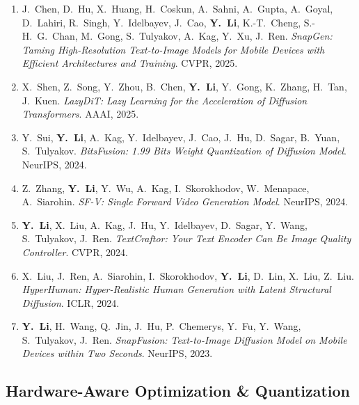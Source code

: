 \documentclass[11pt,letterpaper]{article}
\newcommand{\pub}[4]{%
    \item #1. \textit{#2}. #3, #4.
}
\begin{document}
\begin{enumerate}[resume]
\pub{J.\ Chen, D.\ Hu, X.\ Huang, H.\ Coskun, A.\ Sahni, A.\ Gupta, A.\ Goyal, D.\ Lahiri, R.\ Singh, Y.\ Idelbayev, J.\ Cao, \textbf{Y.\ Li}, K.-T.\ Cheng, S.-H.\ G.\ Chan, M.\ Gong, S.\ Tulyakov, A.\ Kag, Y.\ Xu, J.\ Ren}
    {SnapGen: Taming High-Resolution Text-to-Image Models for Mobile Devices with Efficient Architectures and Training}
    {CVPR}{2025}

\pub{X.\ Shen, Z.\ Song, Y.\ Zhou, B.\ Chen, \textbf{Y.\ Li}, Y.\ Gong, K.\ Zhang, H.\ Tan, J.\ Kuen}
    {LazyDiT: Lazy Learning for the Acceleration of Diffusion Transformers}
    {AAAI}{2025}

\pub{Y.\ Sui, \textbf{Y.\ Li}, A.\ Kag, Y.\ Idelbayev, J.\ Cao, J.\ Hu, D.\ Sagar, B.\ Yuan, S.\ Tulyakov}
    {BitsFusion: 1.99 Bits Weight Quantization of Diffusion Model}
    {NeurIPS}{2024}

\pub{Z.\ Zhang, \textbf{Y.\ Li}, Y.\ Wu, A.\ Kag, I.\ Skorokhodov, W.\ Menapace, A.\ Siarohin}
    {SF-V: Single Forward Video Generation Model}
    {NeurIPS}{2024}

\pub{\textbf{Y.\ Li}, X.\ Liu, A.\ Kag, J.\ Hu, Y.\ Idelbayev, D.\ Sagar, Y.\ Wang, S.\ Tulyakov, J.\ Ren}
    {TextCraftor: Your Text Encoder Can Be Image Quality Controller}
    {CVPR}{2024}

\pub{X.\ Liu, J.\ Ren, A.\ Siarohin, I.\ Skorokhodov, \textbf{Y.\ Li}, D.\ Lin, X.\ Liu, Z.\ Liu}
    {HyperHuman: Hyper-Realistic Human Generation with Latent Structural Diffusion}
    {ICLR}{2024}

\pub{\textbf{Y.\ Li}, H.\ Wang, Q.\ Jin, J.\ Hu, P.\ Chemerys, Y.\ Fu, Y.\ Wang, S.\ Tulyakov, J.\ Ren}
    {SnapFusion: Text-to-Image Diffusion Model on Mobile Devices within Two Seconds}
    {NeurIPS}{2023}

\end{enumerate}

\subsection*{Hardware-Aware Optimization \& Quantization}
\end{document}
